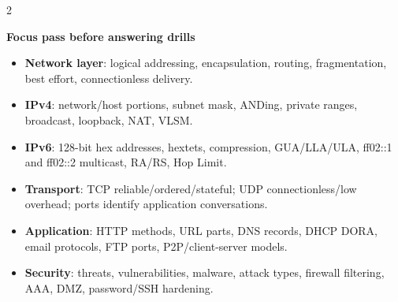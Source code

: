 \documentclass[9pt]{article}
\newcommand{\memorybox}[2]{%
  \begin{tcolorbox}[
    colback=LightRedBg,
    colframe=themeColor!35,
    boxrule=0.4pt,
    arc=2pt,
    left=5pt, right=5pt,
    top=4pt, bottom=4pt,
    before skip=3pt,
    after skip=4pt
  ]
  {\bfseries\color{themeColor}#1}\par\vspace{2pt}
  {\small\RaggedRight #2}
  \end{tcolorbox}
}
\begin{document}
\begin{multicols}{2}
\memorybox{Focus pass before answering drills}{
\begin{itemize}[leftmargin=1em]
  \item \textbf{Network layer}: logical addressing, encapsulation, routing, fragmentation, best effort, connectionless delivery.
  \item \textbf{IPv4}: network/host portions, subnet mask, ANDing, private ranges, broadcast, loopback, NAT, VLSM.
  \item \textbf{IPv6}: 128-bit hex addresses, hextets, compression, GUA/LLA/ULA, ff02::1 and ff02::2 multicast, RA/RS, Hop Limit.
  \item \textbf{Transport}: TCP reliable/ordered/stateful; UDP connectionless/low overhead; ports identify application conversations.
  \item \textbf{Application}: HTTP methods, URL parts, DNS records, DHCP DORA, email protocols, FTP ports, P2P/client-server models.
  \item \textbf{Security}: threats, vulnerabilities, malware, attack types, firewall filtering, AAA, DMZ, password/SSH hardening.
\end{itemize}
}

\end{multicols}

\clearpage
\end{document}

